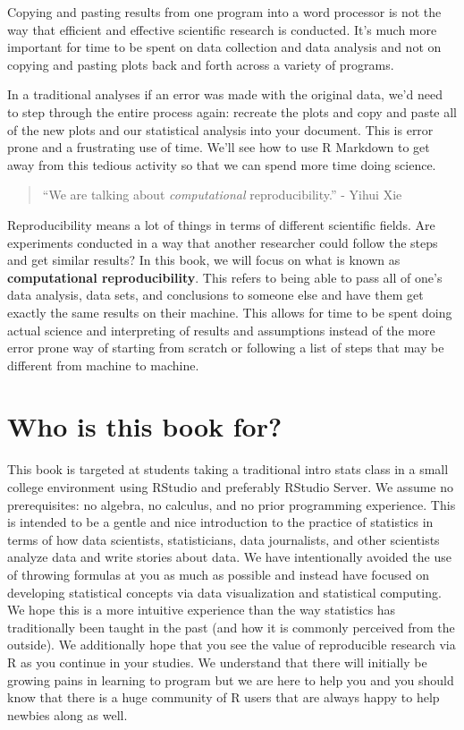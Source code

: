 \documentclass[]{tufte-book}
\begin{document}
Copying and pasting results from one program into a word processor is
not the way that efficient and effective scientific research is
conducted. It's much more important for time to be spent on data
collection and data analysis and not on copying and pasting plots back
and forth across a variety of programs.

In a traditional analyses if an error was made with the original data,
we'd need to step through the entire process again: recreate the plots
and copy and paste all of the new plots and our statistical analysis
into your document. This is error prone and a frustrating use of time.
We'll see how to use R Markdown to get away from this tedious activity
so that we can spend more time doing science.

\begin{quote}
``We are talking about \emph{computational} reproducibility.'' - Yihui
Xie
\end{quote}

Reproducibility means a lot of things in terms of different scientific
fields. Are experiments conducted in a way that another researcher could
follow the steps and get similar results? In this book, we will focus on
what is known as \textbf{computational reproducibility}. This refers to
being able to pass all of one's data analysis, data sets, and
conclusions to someone else and have them get exactly the same results
on their machine. This allows for time to be spent doing actual science
and interpreting of results and assumptions instead of the more error
prone way of starting from scratch or following a list of steps that may
be different from machine to machine.

\section{Who is this book for?}\label{who-is-this-book-for}

This book is targeted at students taking a traditional intro stats class
in a small college environment using RStudio and preferably RStudio
Server. We assume no prerequisites: no algebra, no calculus, and no
prior programming experience. This is intended to be a gentle and nice
introduction to the practice of statistics in terms of how data
scientists, statisticians, data journalists, and other scientists
analyze data and write stories about data. We have intentionally avoided
the use of throwing formulas at you as much as possible and instead have
focused on developing statistical concepts via data visualization and
statistical computing. We hope this is a more intuitive experience than
the way statistics has traditionally been taught in the past (and how it
is commonly perceived from the outside). We additionally hope that you
see the value of reproducible research via R as you continue in your
studies. We understand that there will initially be growing pains in
learning to program but we are here to help you and you should know that
there is a huge community of R users that are always happy to help
newbies along as well.
\end{document}
